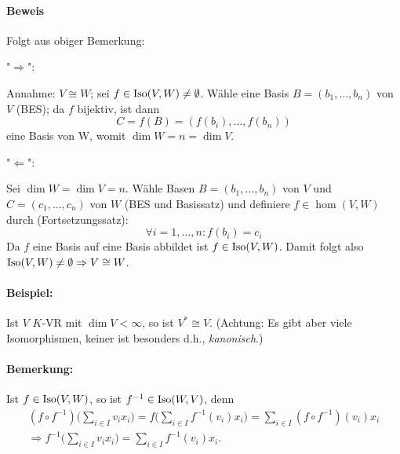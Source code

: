  	\paragraph{Beweis}
 		Folgt aus obiger Bemerkung:

 		"$\Rightarrow$":

 		Annahme: $V \cong W$; sei $f\in \operatorname{Iso}(V,W)\neq \emptyset$.
 		Wähle eine Basis $B = (b_1, \dots, b_n)$ von $V$ (BES); da $f$ bijektiv, ist dann
 		\[
 			C = f(B) = (f(b_i), \dots , f(b_n))
 		\]
 		eine Basis von W, womit $\dim W = n = \dim V$.

 		"$\Leftarrow$":

 		Sei $\dim W = \dim V = n$.
 		Wähle Basen $B = (b_1, \dots ,b_n)$ von $V$ und $C = (c_1, \dots ,c_n)$ von $W$ (BES und Basissatz) und definiere $f\in \hom(V,W)$ durch (Fortsetzungssatz):
 		\[
 			\forall i = 1, ... ,n : f(b_i) = c_i
 		\]
 		Da $f$ eine Basis auf eine Basis abbildet ist $f\in \operatorname{Iso}(V,W)$.
 		Damit folgt also $\operatorname{Iso}(V,W) \neq \emptyset \Rightarrow V \cong W$.

 	\paragraph{Beispiel: }
 		Ist $V$ $K$-VR mit $\dim V < \infty$, so ist $V^\ast \cong V$. (Achtung: Es gibt aber viele Isomorphismen, keiner ist besonders d.h., \emph{kanonisch}.)

 	\paragraph{Bemerkung: }
 		Ist $f\in \operatorname{Iso}(V,W)$, so ist $f^{-1}\in \operatorname{Iso}(W,V)$, denn
 		\begin{gather*}
 			(f\circ f^{-1})\Big(\sum_{i\in I}v_ix_i\Big) = f\Big(\sum_{i\in I}f^{-1}(v_i)x_i\Big) = \sum_{i\in I}(f\circ f^{-1})(v_i)x_i\\
 			\Rightarrow f^{-1}\Big(\sum_{i\in I}v_ix_i\Big) = \sum_{i\in I}f^{-1}(v_i)x_i.
 		\end{gather*}
